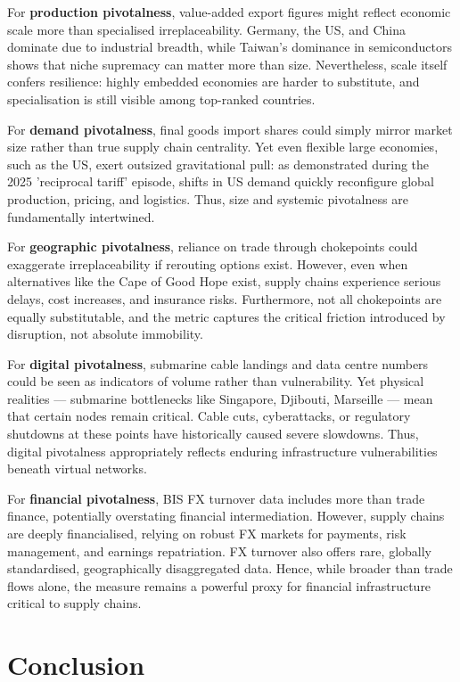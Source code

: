 \documentclass[11pt]{article}
\begin{document}
For \textbf{production pivotalness}, value-added export figures might reflect economic scale more than specialised irreplaceability. Germany, the US, and China dominate due to industrial breadth, while Taiwan’s dominance in semiconductors shows that niche supremacy can matter more than size. Nevertheless, scale itself confers resilience: highly embedded economies are harder to substitute, and specialisation is still visible among top-ranked countries.

For \textbf{demand pivotalness}, final goods import shares could simply mirror market size rather than true supply chain centrality. Yet even flexible large economies, such as the US, exert outsized gravitational pull: as demonstrated during the 2025 'reciprocal tariff' episode, shifts in US demand quickly reconfigure global production, pricing, and logistics. Thus, size and systemic pivotalness are fundamentally intertwined.

For \textbf{geographic pivotalness}, reliance on trade through chokepoints could exaggerate irreplaceability if rerouting options exist. However, even when alternatives like the Cape of Good Hope exist, supply chains experience serious delays, cost increases, and insurance risks. Furthermore, not all chokepoints are equally substitutable, and the metric captures the critical friction introduced by disruption, not absolute immobility.

For \textbf{digital pivotalness}, submarine cable landings and data centre numbers could be seen as indicators of volume rather than vulnerability. Yet physical realities — submarine bottlenecks like Singapore, Djibouti, Marseille — mean that certain nodes remain critical. Cable cuts, cyberattacks, or regulatory shutdowns at these points have historically caused severe slowdowns. Thus, digital pivotalness appropriately reflects enduring infrastructure vulnerabilities beneath virtual networks.

For \textbf{financial pivotalness}, BIS FX turnover data includes more than trade finance, potentially overstating financial intermediation. However, supply chains are deeply financialised, relying on robust FX markets for payments, risk management, and earnings repatriation. FX turnover also offers rare, globally standardised, geographically disaggregated data. Hence, while broader than trade flows alone, the measure remains a powerful proxy for financial infrastructure critical to supply chains.

\section{Conclusion}
\label{sec:conclusion}
\end{document}
